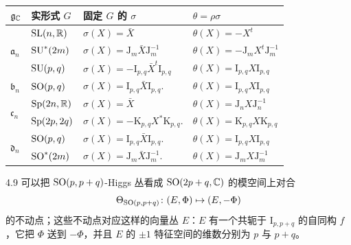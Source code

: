 \begin{table}[htbp]
\centering
\small
\begin{tabular}{llll}
\toprule
$\mathfrak{g}_{\mathbb{C}}$ & 实形式 $G$ & 固定 $G$ 的 $\sigma$ & $\theta=\rho\sigma$ \\
\midrule
\multirow{3}{*}{$\mathfrak{a}_n$} & $\mathrm{SL}(n,\mathbb{R})$ & $\sigma(X)=\bar{X}$ & $\theta(X)=-X^t$ \\
 & $\mathrm{SU}^*(2m)$ & $\sigma(X)=\mathrm{J}_m\bar{X}\mathrm{J}_m^{-1}$ & $\theta(X)=-\mathrm{J}_m X^t\mathrm{J}_m^{-1}$ \\
 & $\mathrm{SU}(p,q)$ & $\sigma(X)=-\mathrm{I}_{p,q}\bar{X}^t\mathrm{I}_{p,q}$ & $\theta(X)=\mathrm{I}_{p,q}X\mathrm{I}_{p,q}$ \\
\midrule
$\mathfrak{b}_n$ & $\mathrm{SO}(p,q)$ & $\sigma(X)=\mathrm{I}_{p,q}\bar{X}\mathrm{I}_{p,q}.$ & $\theta(X)=\mathrm{I}_{p,q}X\mathrm{I}_{p,q}$ \\
\midrule
\multirow{2}{*}{$\mathfrak{c}_n$} & $\mathrm{Sp}(2n,\mathbb{R})$ & $\sigma(X)=\bar{X}$ & $\theta(X)=\mathrm{J}_n X\mathrm{J}_n^{-1}$ \\
 & $\mathrm{Sp}(2p,2q)$ & $\sigma(X)=-\mathrm{K}_{p,q}X^*\mathrm{K}_{p,q}.$ & $\theta(X)=\mathrm{K}_{p,q}X\mathrm{K}_{p,q}$ \\
\midrule
\multirow{2}{*}{$\mathfrak{d}_n$} & $\mathrm{SO}(p,q)$ & $\sigma(X)=\mathrm{I}_{p,q}\bar{X}\mathrm{I}_{p,q}.$ & $\theta(X)=\mathrm{I}_{p,q}X\mathrm{I}_{p,q}$ \\
 & $\mathrm{SO}^*(2m)$ & $\sigma(X)=\mathrm{J}_m\bar{X}\mathrm{J}_m^{-1}.$ & $\theta(X)=\mathrm{J}_m X\mathrm{J}_m^{-1}$ \\
\bottomrule
\end{tabular}
\end{table}


\begin{exmp}{4.9}
可以把 $\mathrm{SO}(p,p+q)$-Higgs 丛看成 $\mathrm{SO}(2p+q,\mathbb{C})$ 的模空间上对合
\[
\Theta_{\mathrm{SO}(p,p+q)}\colon (E,\Phi)\mapsto(E,-\Phi)
\]
的不动点；这些不动点对应这样的向量丛 $E$：$E$ 有一个共轭于 $\mathrm{I}_{p,p+q}$ 的自同构 $f$，它把 $\Phi$ 送到 $-\Phi$，并且 $E$ 的 $\pm1$ 特征空间的维数分别为 $p$ 与 $p+q$。
\end{exmp}

